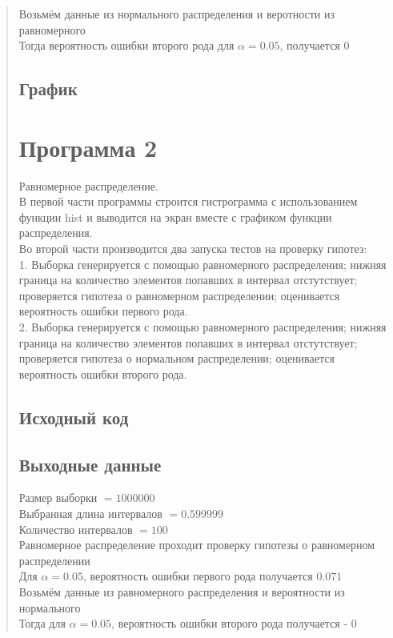 \documentclass{article}
\begin{document}
\begin{quote}
	Возьмём данные из нормального распределения и веротности из равномерного \\
	Тогда вероятность ошибки второго рода для $\alpha = 0.05$, получается $0$
\subsection{График}

\section{Программа 2}
	Равномерное распределение. \\
	В первой части программы строится гистрограмма с использованием функции hist и выводится на экран вместе с графиком функции распределения. \\
	Во второй части производится два запуска тестов на проверку гипотез: \\
	1. Выборка генерируется с помощью равномерного распределения; нижняя граница на количество элементов попавших в интервал отстутствует; проверяется гипотеза о равномерном распределении; оценивается вероятность ошибки первого рода. \\
	2. Выборка генерируется с помощью равномерного распределения; нижняя граница на количество элементов попавших в интервал отстутствует; проверяется гипотеза о нормальном распределении; оценивается вероятность ошибки второго рода. \\
\subsection{Исходный код}
	
\subsection{Выходные данные}
	Размер выборки $= 1000000$ \\
	Выбранная длина интервалов $= 0.599999$ \\
	Количество интервалов $= 100$ \\

	Равномерное распределение проходит проверку гипотезы о равномерном распределении \\
	Для $\alpha = 0.05$, вероятность ошибки первого рода получается $0.071$ \\

	Возьмём данные из равномерного распределения и вероятности из нормального \\
	Тогда для $\alpha = 0.05$, вероятность ошибки второго рода получается - $0$ 

\end{quote}
\end{document}

